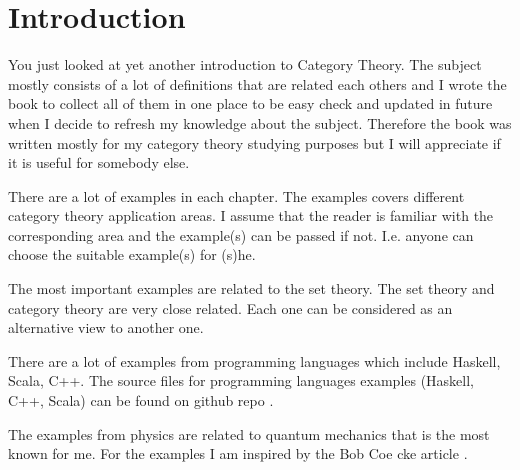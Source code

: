 \chapter*{Introduction}

You just looked at yet another introduction to Category Theory. The
subject mostly consists of a lot of definitions that are related each
others and I wrote the book to collect all of them in one
place to be easy check and updated in future when I decide to refresh
my knowledge about the subject. Therefore the book was written mostly
for my category theory studying 
purposes but I will appreciate if it is useful for somebody else.

There are a lot of 
examples in each chapter. The examples covers different category
theory application areas. I assume that the reader is familiar with
the corresponding area and the example(s) can be passed if not. I.e.
anyone can choose the suitable example(s) for (s)he. 

The most important examples are related to the set theory. The set
theory and category theory are very close related. Each one can be
considered as an alternative view to another one.

There are a lot of examples from programming languages which include
Haskell, Scala, C++. The source files for programming languages 
examples (Haskell, C++, Scala) can be found on github repo
\cite{bib:github:ivanmurashko}.  

The examples from physics are related to quantum mechanics that is the
most known for me. For the examples I am inspired by the Bob Coe cke
article \cite{bib:arxiv:Bob_Coecke_2008}.




